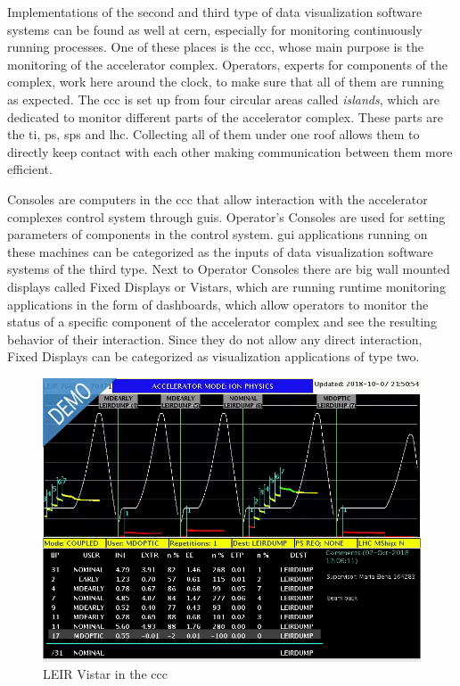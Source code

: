 Implementations of the second and third type of data visualization software
systems can be found as well at \gls{cern}, especially for monitoring
continuously running processes. One of these places is the \gls{ccc}, whose
main purpose is the monitoring of the accelerator complex. Operators, experts
for components of the complex, work here around the clock, to make sure that all
of them are running as expected. The \gls{ccc} is set up from four circular
areas called \emph{islands}, which are dedicated to monitor different parts of
the accelerator complex. These parts are the \gls{ti}, \gls{ps}, \gls{sps} and
\gls{lhc}. Collecting all of them under one roof allows them to directly keep
contact with each other making communication between them more efficient.
\cite{DayInCCC}

Consoles are computers in the \gls{ccc} that allow interaction with the
accelerator complexes control system through \glspl{gui}. Operator's Consoles
are used for setting parameters of components in the control system. \gls{gui}
applications running on these machines can be categorized as the inputs of data
visualization software systems of the third type.  Next to Operator Consoles
there are big wall mounted displays called Fixed Displays or Vistars, which are
running runtime monitoring applications in the form of dashboards, which allow
operators to monitor the status of a specific component of the accelerator
complex and see the resulting behavior of their interaction. Since they do not
allow any direct interaction, Fixed Displays can be categorized as visualization
applications of type two.
\cite{ControlSystemBible}

\begin{figure}[h]
    \centering
    \includegraphics[width=12cm]{resources/img/LEIRVistar}
    \caption{LEIR Vistar in the \gls{ccc}}
    \label{fig:leir}
\end{figure}

